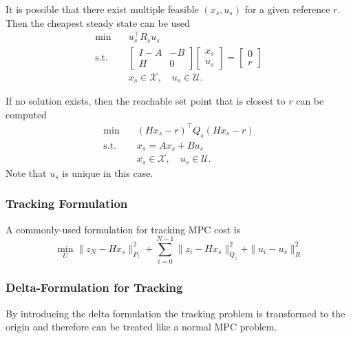 \newpar{}

It is possible that there exist multiple feasible $(x_s, u_s)$ for a given reference $r$. Then the cheapest steady state can be used
\begin{align*}
    \min\quad    & u_s^\top R_s u_s                                \\
    \text{s.t. } & \begin{bmatrix}
                       I-A & -B \\
                       H   & 0
                   \end{bmatrix}
    \begin{bmatrix}
        x_s \\
        u_s
    \end{bmatrix}
    = \begin{bmatrix}
          0 \\
          r
      \end{bmatrix}                                               \\
                 & x_s \in \mathcal{X}, \quad u_s \in \mathcal{U}.
\end{align*}

\newpar{}

If no solution exists, then the reachable set point that is closest to $r$ can be computed
\begin{align*}
    \min\quad    & {\left(Hx_s -r\right)}^\top Q_s \left(Hx_s -r\right) \\
    \text{s.t. } & x_s = Ax_s + Bu_s                                    \\
                 & x_s \in \mathcal{X}, \quad u_s \in \mathcal{U}.
\end{align*}
Note that $u_s$ is unique in this case.

\subsubsection{Tracking Formulation}
A commonly-used formulation for tracking MPC cost is
\begin{equation*}
    \min_{U}\|z_{N}-Hx_{s}\|_{P_{z}}^{2}+\sum_{i=0}^{N-1}\|z_{i}-Hx_{s}\|_{Q_{z}}^{2}+\|u_{i}-u_{s}\|_{R}^{2}
\end{equation*}

\subsubsection{Delta-Formulation for Tracking}
By introducing the delta formulation the tracking problem is transformed to the origin and therefore can be treated like a normal MPC problem.


